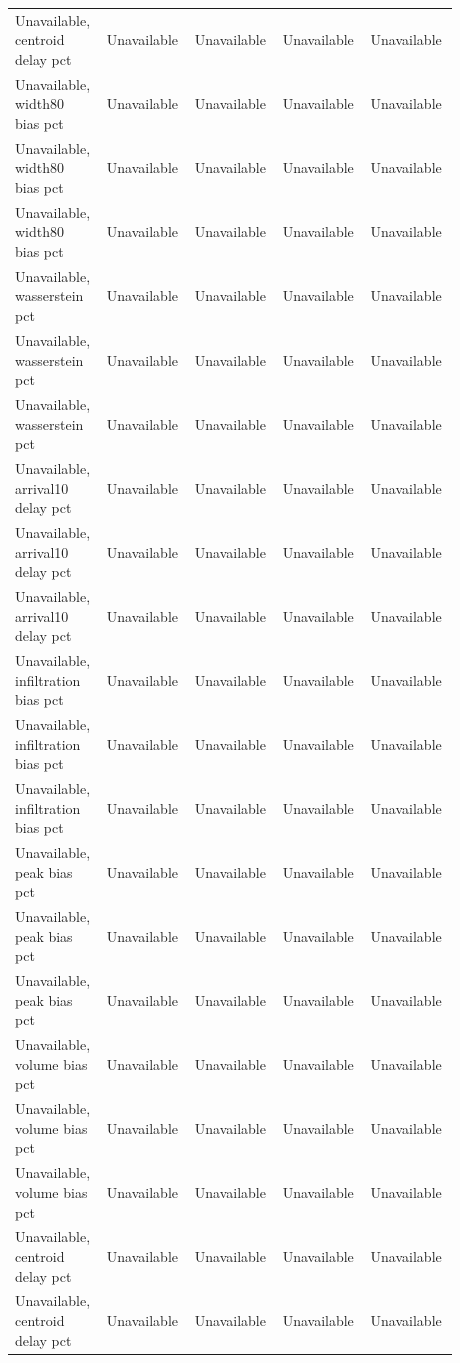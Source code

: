 \begin{longtable}{p{0.1760\linewidth}p{0.1760\linewidth}p{0.1760\linewidth}p{0.1760\linewidth}p{0.1760\linewidth}}
Unavailable, centroid delay pct & Unavailable & Unavailable & Unavailable & Unavailable \\
Unavailable, width80 bias pct & Unavailable & Unavailable & Unavailable & Unavailable \\
Unavailable, width80 bias pct & Unavailable & Unavailable & Unavailable & Unavailable \\
Unavailable, width80 bias pct & Unavailable & Unavailable & Unavailable & Unavailable \\
Unavailable, wasserstein pct & Unavailable & Unavailable & Unavailable & Unavailable \\
Unavailable, wasserstein pct & Unavailable & Unavailable & Unavailable & Unavailable \\
Unavailable, wasserstein pct & Unavailable & Unavailable & Unavailable & Unavailable \\
Unavailable, arrival10 delay pct & Unavailable & Unavailable & Unavailable & Unavailable \\
Unavailable, arrival10 delay pct & Unavailable & Unavailable & Unavailable & Unavailable \\
Unavailable, arrival10 delay pct & Unavailable & Unavailable & Unavailable & Unavailable \\
Unavailable, infiltration bias pct & Unavailable & Unavailable & Unavailable & Unavailable \\
Unavailable, infiltration bias pct & Unavailable & Unavailable & Unavailable & Unavailable \\
Unavailable, infiltration bias pct & Unavailable & Unavailable & Unavailable & Unavailable \\
Unavailable, peak bias pct & Unavailable & Unavailable & Unavailable & Unavailable \\
Unavailable, peak bias pct & Unavailable & Unavailable & Unavailable & Unavailable \\
Unavailable, peak bias pct & Unavailable & Unavailable & Unavailable & Unavailable \\
Unavailable, volume bias pct & Unavailable & Unavailable & Unavailable & Unavailable \\
Unavailable, volume bias pct & Unavailable & Unavailable & Unavailable & Unavailable \\
Unavailable, volume bias pct & Unavailable & Unavailable & Unavailable & Unavailable \\
Unavailable, centroid delay pct & Unavailable & Unavailable & Unavailable & Unavailable \\
Unavailable, centroid delay pct & Unavailable & Unavailable & Unavailable & Unavailable \\

\end{longtable}
